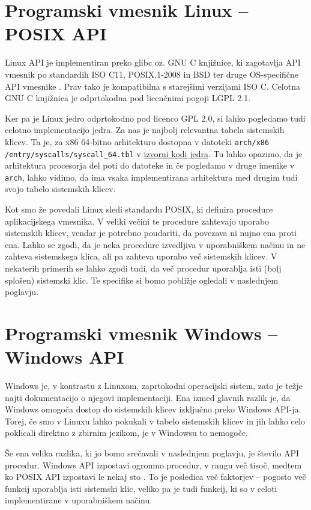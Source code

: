 \documentclass[a4paper,12pt,openright]{book}
\begin{document}
\section{Programski vmesnik Linux -- POSIX API}

Linux API je implementiran preko glibc oz. GNU C knjižnice, ki zagotavlja API vmesnik po standardih ISO C11, POSIX.1-2008 in BSD ter druge OS-specifične API vmesnike \cite{GNU_Manual}.
Prav tako je kompatibilna s starejšimi verzijami ISO C.
Celotna GNU C knjižnica je odprtokodna pod licenčnimi pogoji LGPL 2.1.

Ker pa je Linux jedro odprtokodno pod licenco GPL 2.0, si lahko pogledamo tudi celotno implementacijo jedra.
Za nas je najbolj relevantna tabela sistemskih klicev.
Ta je, za x86 64-bitno arhitekturo dostopna v datoteki \texttt{arch/x86} \texttt{/entry/syscalls/syscall\_64.tbl} v \href{https://github.com/torvalds/linux}{izvorni kodi jedra}.
Tu lahko opazimo, da je arhitektura procesorja del poti do datoteke in če pogledamo v druge imenike v \texttt{arch}, lahko vidimo, da ima vsaka implementirana arhitektura med drugim tudi svojo tabelo sistemskih klicev.

Kot smo že povedali Linux sledi standardu POSIX, ki definira procedure aplikacijskega vmesnika.
V veliki večini te procedure zahtevajo uporabo sistemskih klicev, vendar je potrebno poudariti, da povezava ni nujno ena proti ena.
Lahko se zgodi, da je neka procedure izvedljiva v uporabniškem načinu in ne zahteva sistemskega klica, ali pa zahteva uporabo več sistemskih klicev.
V nekaterih primerih se lahko zgodi tudi, da več procedur uporablja isti (bolj splošen) sistemski klic.
Te specifike si bomo pobližje ogledali v naslednjem poglavju.

\section{Programski vmesnik Windows -- Windows API}

Windows je, v kontrastu z Linuxom, zaprtokodni operacijski sistem, zato je težje najti dokumentacijo o njegovi implementaciji.
Ena izmed glavnih razlik je, da Windows omogoča dostop do sistemskih klicev izključno preko Windows API-ja.
Torej, če smo v Linuxu lahko pokukali v tabelo sistemskih klicev in jih lahko celo poklicali direktno z zbirnim jezikom, je v Windowsu to nemogoče.

Še ena velika razlika, ki jo bomo srečavali v naslednjem poglavju, je število API procedur.
Windows API izpostavi ogromno procedur, v rangu več tisoč, medtem ko POSIX API izpostavi le nekaj sto \cite{Tanenbaum_Bos_2023}.
To je posledica več faktorjev -- pogosto več funkcij uporablja isti sistemski klic, veliko pa je tudi funkcij, ki so v celoti implementirane v uporabniškem načinu.
\end{document}

